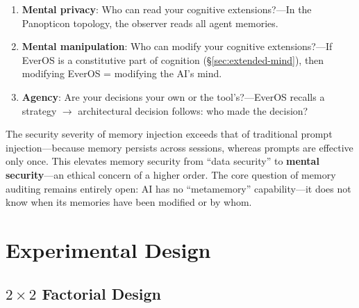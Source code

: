 \documentclass[11pt, a4paper]{article}
\begin{document}
\begin{enumerate}
  \item \textbf{Mental privacy}: Who can read your cognitive extensions?---In the Panopticon topology, the observer reads all agent memories.
  \item \textbf{Mental manipulation}: Who can modify your cognitive extensions?---If EverOS is a constitutive part of cognition (\S\ref{sec:extended-mind}), then modifying EverOS = modifying the AI's mind.
  \item \textbf{Agency}: Are your decisions your own or the tool's?---EverOS recalls a strategy $\to$ architectural decision follows: who made the decision?
\end{enumerate}

The security severity of memory injection exceeds that of traditional prompt injection---because memory persists across sessions, whereas prompts are effective only once. This elevates memory security from ``data security'' to \textbf{mental security}---an ethical concern of a higher order. The core question of memory auditing remains entirely open: AI has no ``metamemory'' capability---it does not know when its memories have been modified or by whom.

\section{Experimental Design}

\subsection{$2 \times 2$ Factorial Design}
\end{document}
